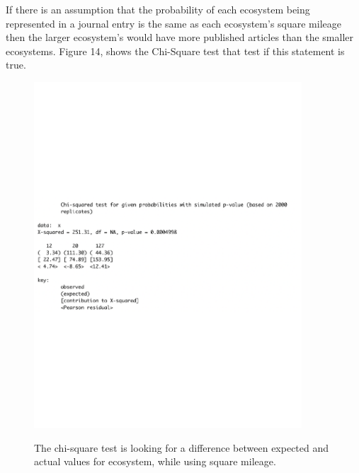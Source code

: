 \documentclass[12pt, letterpaper]{article}
\begin{document}
If there is an assumption that the probability of each ecosystem being represented in a journal entry is the same as each ecosystem's square mileage then the larger ecosystem's would have more published articles than the smaller ecosystems. Figure 14, shows the Chi-Square test that test if this statement is true. 
\begin{figure}[h]
\begin{center}
	\includegraphics[width=10cm]{chi-eco-2.pdf}
	\label{fig: Chi-Square Test: Ecosystem}
	\caption{The chi-square test is looking for a difference between expected and actual values for ecosystem, while using square mileage.}
\end{center}
\end{figure}
\end{document}
